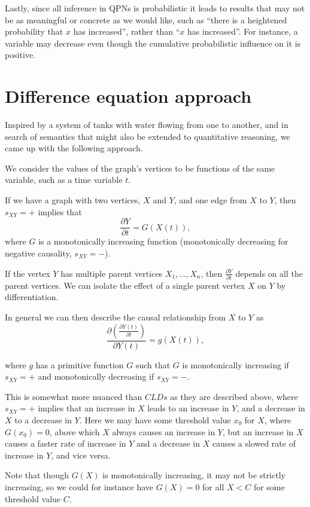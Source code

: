 \documentclass[a4paper,11pt]{article}
\begin{document}
Lastly, since all inference in QPNs is probabilistic it leads to
results that may not be as meaningful or concrete as we would like,
such as ``there is a heightened probability that $x$ has increased'',
rather than ``$x$ has increased''.
%
For instance, a variable may decrease even though the cumulative
probabilistic influence on it is positive.

\section{Difference equation approach}

Inspired by a system of tanks with water flowing from one to another,
and in search of semantics that might also be extended to quantitative
reasoning, we came up with the following approach.

We consider the values of the graph's vertices to be functions of the same
variable, such as a time variable $t$.

If we have a graph with two vertices, $X$ and $Y$, and one edge from $X$
to $Y$, then $s_{XY}=+$ implies that
\[\frac{\partial Y}{\partial t} = G(X(t)),\]
where $G$ is a monotonically increasing function (monotonically decreasing for negative
causality, $s_{XY}=-$).

If the vertex $Y$ has multiple parent vertices $X_1,\ldots,X_n$, then
$\frac{\partial Y}{\partial t}$ depends on all the parent vertices. We can
isolate the effect of a single parent vertex
 $X$ on $Y$ by differentiation.

In general we can then describe the causal relationship from $X$ to
$Y$ as
\[\frac{\partial\left( \frac{\partial Y(t)}{\partial t} \right)}{\partial Y(t)} =
  g(X(t)),\]

where $g$ has a primitive function $G$ such that $G$ is monotonically
increasing if $s_{XY}=+$ and monotonically decreasing if $s_{XY}= -$.

This is somewhat more nuanced than $CLDs$ as they are described above,
where $s_{XY}=+$ implies that an increase in $X$ leads to an increase
in $Y$, and a decrease in $X$ to a decrease in $Y$.
%
Here we may have some threshold value $x_0$ for $X$, where $G(x_0) = 0$,
above which $X$ always causes an increase in $Y$, but an increase in $X$
causes a faster rate of increase in $Y$ and a decrease in $X$ causes a
slowed rate of increase in $Y$, and vice versa.

Note that though $G(X)$ is monotonically increasing, it may not be strictly
increasing, so we could for instance have $G(X) = 0$ for all $X < C$
for some threshold value $C$.
\end{document}

